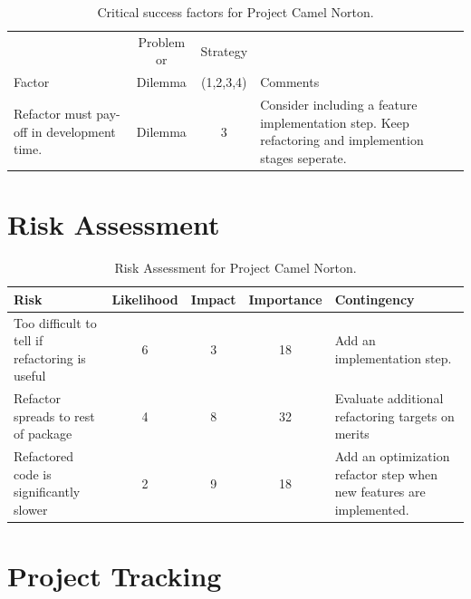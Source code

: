 \documentclass[11pt]{nmemo}
\begin{document}
\begin{table}[ht]
  \begin{center}
    \caption{Critical success factors for Project Camel Norton.}
    \label{tab:critical-success}
    \begin{tabular}{|p{4.5cm}|c|c|p{4.5cm}|} 
    \hline
                       & Problem or & Strategy  &          \\
    Factor             &  Dilemma   & (1,2,3,4) & Comments \\ 
    \hline\hline
    Refactor must pay-off in development time.
    & Dilemma & 3 
    & Consider including a feature implementation step. Keep
    refactoring and implemention stages seperate. \\ 
    \hline
    \end{tabular}
  \end{center}
\end{table}


\newpage
\section*{Risk Assessment}

\begin{table}[ht]
  \begin{center}
    \caption{Risk Assessment for Project Camel Norton.}
    \label{tab:risk}
    \begin{tabular}{|p{4.5cm}|c|c|c|p{4.5cm}|} 
    \hline
    Risk & Likelihood & Impact & Importance & Contingency \\ 
    \hline\hline
    Too difficult to tell if refactoring is useful & 6 & 3 & 18 &
    Add an implementation step. \\
    \hline
    Refactor spreads to rest of package & 4 & 8 & 32 &
    Evaluate additional refactoring targets on merits \\
    \hline
    Refactored code is significantly slower & 2 & 9 & 18 &
    Add an optimization refactor step when new features are
    implemented. \\ \hline
    \end{tabular}
  \end{center}
\end{table}

\newpage
\newpage
\section*{Project Tracking}
\end{document}

